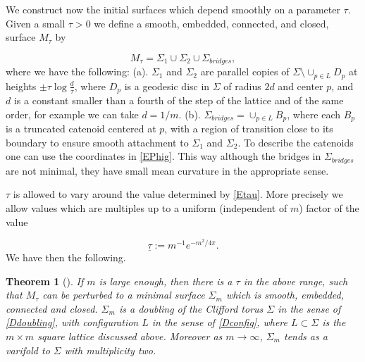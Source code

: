 \documentclass[12pt,namelimits,sumlimits]{amsart}
\newtheorem{theorem}{Theorem}[section]
\theoremstyle{remark}
\numberwithin{equation}{section}
\begin{document}
We construct now the initial surfaces which depend smoothly on a parameter $\tau$.
Given a small $\tau>0$ we define a smooth, embedded, connected,
and closed, surface $M_\tau$
by
\addtocounter{theorem}{1}
\begin{equation}
\label{EMtau}
M_\tau=\Sigma_1\cup\Sigma_2\cup \Sigma_{bridges},
\end{equation}
where we have the following:
\newline
(a). $\Sigma_1$ and $\Sigma_2$ are parallel copies 
of $\Sigma\setminus\cup_{p\in L}D_p$
at heights $\pm\tau\log\frac d \tau$,
where $D_p$ is a geodesic disc in $\Sigma$ of radius $2d$ and center $p$,
and $d$ is a constant smaller than a fourth of the step of the lattice and of the same order,
for example we can take $d=1/m$.
\newline
(b). $\Sigma_{bridges}=\cup_{p\in L} B_p$,
where each $B_p$ is a truncated catenoid centered at $p$,
with a region of transition close to its boundary
to ensure smooth attachment to $\Sigma_1$ and $\Sigma_2$.
To describe the catenoids one can use
the coordinates in \ref{EPhig}.
This way although the bridges in $\Sigma_{bridges}$
are not minimal, they have small mean curvature in the appropriate sense.

$\tau$ is allowed to vary around the value determined by \ref{Etau}.
More precisely we allow values which are multiples up to a uniform (independent of $m$) factor
of the value
\addtocounter{theorem}{1}
\begin{equation}
\label{Etb}
  {{\underline{\tau}}} := m^{-1}e^{-m^2/4\pi}.
\end{equation}
We have then the following.
\addtocounter{equation}{1}
\begin{theorem}[\cite{kapouleas:clifford}]
\label{Tclifford}
If $m$ is large enough, then there is a $\tau$ in the above range,
such that $M_\tau$ can be perturbed to a minimal surface $\Sigma_m$
which is smooth, embedded, connected and closed.
$\Sigma_m$ is a doubling of the Clifford torus $\Sigma$ in the sense of \ref{Ddoubling},
with configuration $L$ in the sense of \ref{Dconfig},
where $L\subset \Sigma$ is the $m\times m$ square lattice discussed above.
Moreover as $m\to\infty$, $\Sigma_m$ tends as a varifold to $\Sigma$ with multiplicity two. 
\end{theorem}
\end{document}
